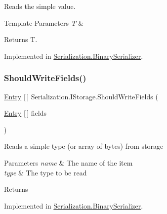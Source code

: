 Reads the simple value. 


\begin{DoxyTemplParams}{Template Parameters}
{\em T} & \\
\hline
\end{DoxyTemplParams}
\begin{DoxyReturn}{Returns}
T.
\end{DoxyReturn}


Implemented in \hyperlink{class_serialization_1_1_binary_serializer_ad46b4de7951611009e2e85d00ad8178d}{Serialization.\+Binary\+Serializer}.

\mbox{\label{interface_serialization_1_1_i_storage_a0795ec3b6aa77280885c34e2822cb410}} 
\subsubsection{\texorpdfstring{Should\+Write\+Fields()}{ShouldWriteFields()}}
{\footnotesize\ttfamily \hyperlink{class_serialization_1_1_entry}{Entry} \mbox{[}$\,$\mbox{]} Serialization.\+I\+Storage.\+Should\+Write\+Fields (\begin{DoxyParamCaption}\item[{\hyperlink{class_serialization_1_1_entry}{Entry} \mbox{[}$\,$\mbox{]}}]{fields }\end{DoxyParamCaption})}



Reads a simple type (or array of bytes) from storage 


\begin{DoxyParams}{Parameters}
{\em name} & The name of the item\\
\hline
{\em type} & The type to be read\\
\hline
\end{DoxyParams}
\begin{DoxyReturn}{Returns}

\end{DoxyReturn}


Implemented in \hyperlink{class_serialization_1_1_binary_serializer_a1813abad4bdfe9607f093e4df66a4414}{Serialization.\+Binary\+Serializer}.

\mbox{\label{interface_serialization_1_1_i_storage_a0d4c95743d604600b55492194d54717b}} 
